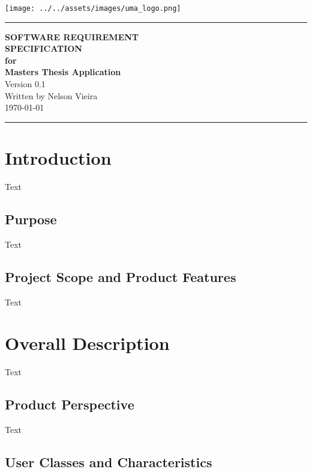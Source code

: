 \documentclass{scrreprt}
\date{}
\begin{document}
\begin{flushright}
    \texttt{[image: ../../assets/images/uma\_logo.png]}
    \rule{16cm}{5pt}\vskip1cm
    \Huge{\textbf{\uppercase{Software Requirement}} \\ \textbf{\uppercase{Specification}}} \\
    \vspace{1cm}
    \textbf{for} \\
    \vspace{1cm}
    \textbf{Masters Thesis Application} \\
    \vspace{2cm}
    \LARGE{Version 0.1 \\}
    \vspace{2cm}
    Written by Nelson Vieira \\
    \vspace{2cm}
    \today
    \vfill
    \rule{16cm}{5pt}
\end{flushright}

\tableofcontents

\chapter{Introduction}

Text

\section{Purpose}

Text

\section{Project Scope and Product Features}

Text

\chapter{Overall Description}

Text

\section{Product Perspective}

Text

\section{User Classes and Characteristics}
\end{document}
